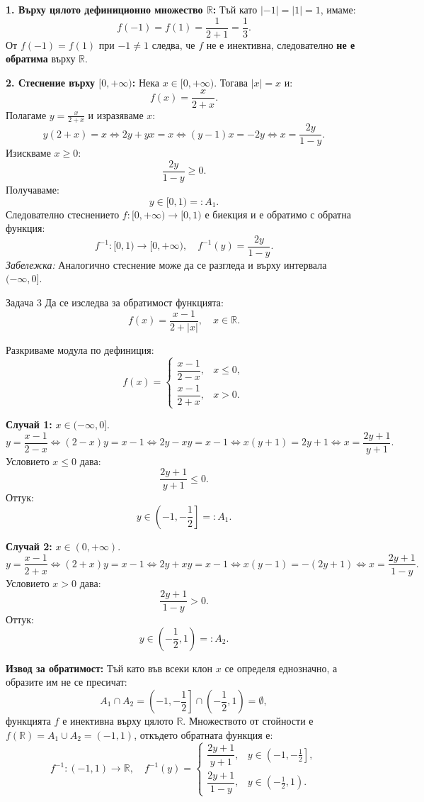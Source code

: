 \begin{solution}
\textbf{1. Върху цялото дефиниционно множество $\mathbb{R}$:}
Тъй като $|-1| = |1| = 1$, имаме:
\[
f(-1) = f(1) = \frac{1}{2 + 1} = \frac{1}{3}.
\]
От $f(-1) = f(1)$ при $-1 \neq 1$ следва, че $f$ не е инективна, следователно \textbf{не е обратима} върху $\mathbb{R}$.

\textbf{2. Стеснение върху $[0, +\infty)$:}
Нека $x \in [0, +\infty)$. Тогава $|x| = x$ и:
\[
f(x) = \frac{x}{2 + x}.
\]
Полагаме $y = \frac{x}{2 + x}$ и изразяваме $x$:
\[
y(2 + x) = x \iff 2y + yx = x \iff (y - 1)x = -2y \iff x = \frac{2y}{1 - y}.
\]
Изискваме $x \ge 0$:
\[
\frac{2y}{1 - y} \ge 0.
\]
Получаваме:
\[
y \in [0, 1) =: A_1.
\]
Следователно стеснението $f: [0, +\infty) \to [0, 1)$ е биекция и е обратимо с обратна функция:
\[
f^{-1}: [0, 1) \to [0, +\infty), \quad f^{-1}(y) = \frac{2y}{1 - y}.
\]
\textit{Забележка:} Аналогично стеснение може да се разгледа и върху интервала $(-\infty, 0]$.
\end{solution}

\vspace{1em}

\begin{problembox}{Задача 3}
Да се изследва за обратимост функцията:
\[
f(x) = \frac{x - 1}{2 + |x|}, \quad x \in \mathbb{R}.
\]
\end{problembox}

\begin{solution}
Разкриваме модула по дефиниция:
\[
f(x) = 
\begin{cases}
\dfrac{x - 1}{2 - x}, & x \le 0, \\[8pt]
\dfrac{x - 1}{2 + x}, & x > 0.
\end{cases}
\]

\textbf{Случай 1:} $x \in (-\infty, 0]$.
\[
y = \frac{x - 1}{2 - x} \iff (2 - x)y = x - 1 \iff 2y - xy = x - 1 \iff x(y + 1) = 2y + 1 \iff x = \frac{2y + 1}{y + 1}.
\]
Условието $x \le 0$ дава:
\[
\frac{2y + 1}{y + 1} \le 0.
\]
Оттук:
\[
y \in \left(-1, -\frac{1}{2}\right] =: A_1.
\]

\textbf{Случай 2:} $x \in (0, +\infty)$.
\[
y = \frac{x - 1}{2 + x} \iff (2 + x)y = x - 1 \iff 2y + xy = x - 1 \iff x(y - 1) = -(2y + 1) \iff x = \frac{2y + 1}{1 - y}.
\]
Условието $x > 0$ дава:
\[
\frac{2y + 1}{1 - y} > 0.
\]
Оттук:
\[
y \in \left(-\frac{1}{2}, 1\right) =: A_2.
\]

\textbf{Извод за обратимост:}
Тъй като във всеки клон $x$ се определя еднозначно, а образите им не се пресичат:
\[
A_1 \cap A_2 = \left(-1, -\frac{1}{2}\right] \cap \left(-\frac{1}{2}, 1\right) = \emptyset,
\]
функцията $f$ е инективна върху цялото $\mathbb{R}$. Множеството от стойности е $f(\mathbb{R}) = A_1 \cup A_2 = (-1, 1)$, откъдето обратната функция е:
\[
f^{-1}: (-1, 1) \to \mathbb{R}, \quad f^{-1}(y) = 
\begin{cases}
\dfrac{2y + 1}{y + 1}, & y \in \left(-1, -\frac{1}{2}\right], \\[10pt]
\dfrac{2y + 1}{1 - y}, & y \in \left(-\frac{1}{2}, 1\right).
\end{cases}
\]
\end{solution}

